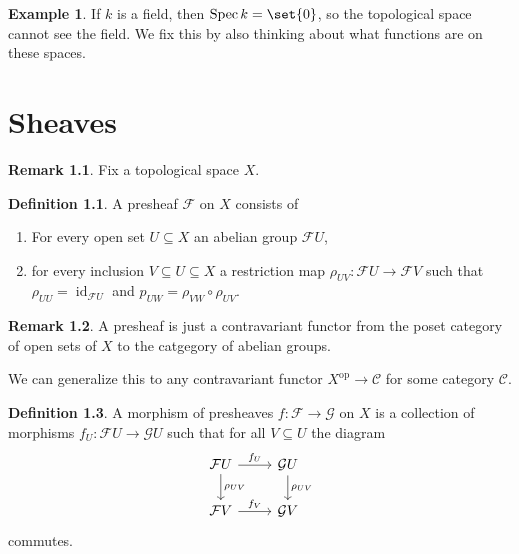 \documentclass[a4paper]{amsbook}
\theoremstyle{definition}
\newtheorem{definition}{Definition}[chapter]
\newtheorem{remark}[definition]{Remark}
\newtheorem{example}[definition]{Example}
\newtheorem*{remark*}{Remark}
\DeclareMathOperator\Spec{Spec}
\DeclareMathOperator\id{id}
\begin{document}
\begin{example}
\label{Field}
If $k$ is a field, then $\Spec k = \set{0}$, so the topological space cannot
see the field. We fix this by also thinking about what functions are on
these spaces.
\end{example}


\chapter{Sheaves}
\label{Sheaves}
\begin{remark*}
\label{FixSpace}
Fix a topological space $X$.
\end{remark*}

\begin{definition}
\label{Presheaf}
A presheaf $\mathcal{F}$ on $X$ consists of
\begin{enumerate}
	\item For every open set $U \subseteq X$ an abelian group $\mathcal{F}U$,
	\item for every inclusion $V \subseteq U \subseteq X$ a restriction map
		$\rho_{UV}\colon \mathcal{F}U \to \mathcal{F}V$ such that $\rho_{UU} = \id_{\mathcal{F}U}$ and
		$p_{UW} = \rho_{VW} \circ \rho_{UV}$.
\end{enumerate}
\end{definition}

\begin{remark}
\label{PresheafCategorically}
A presheaf is just a contravariant functor from the poset category of open sets
of $X$ to the catgegory of abelian groups.

We can generalize this to any contravariant functor $X^{\text{op}}\to \mathcal{C}$ for
some category $\mathcal{C}$.
\end{remark}

\begin{definition}
\label{MorphismOfPresheaves}
A morphism of presheaves $f\colon \mathcal{F}\to \mathcal{G}$ on $X$ is a collection of morphisms
$f_U\colon \mathcal{F}U\to \mathcal{G}U$ such that for all $V \subseteq U$ the diagram
\[
	\begin{tikzcd}
		\mathcal{F}U\ar[r, "f_U"]\ar[d, "\rho_{UV}"] & \mathcal{G}U\ar[d, "\rho_{UV}"]\\
		\mathcal{F}V\ar[r, "f_V"] & \mathcal{G}V
	\end{tikzcd}
	\]
commutes.
\end{definition}
\end{document}
